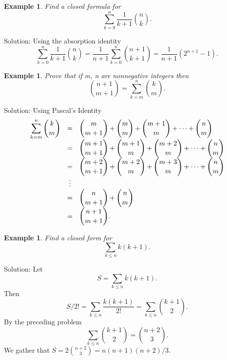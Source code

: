 \documentclass[11pt, openany]{book}
\theoremstyle{change} \theoremheaderfont{\blue\sffamily\bfseries}
\newtheorem{exa}[thm]{Example}
\theoremstyle{nonumberplain} \theoremheaderfont{\sffamily\bfseries}
\def\binom#1#2{{#1\choose#2}}
\newcommand{\í}{\'{\i}}
\begin{document}
\begin{exa} Find a closed formula for $$ \sum _{k = 0} ^n \frac{1}{k +
1}\binom{n}{k}.$$\end{exa} Solution:  Using the absorption
identity
$$ \sum _{k = 0} ^{n}\frac{1}{k + 1} \binom{n}{k} = \frac{1}{n + 1}\sum _{k = 0} ^n  \binom{n + 1}{k + 1} =
\frac{1}{n + 1}(2^{n + 1} - 1).$$

\begin{exa}Prove that if m, n are nonnegative integers then $$ \binom{n +
1}{m + 1} = \sum _{k = m} ^n \binom{k}{m}.$$ \end{exa} Solution:
Using Pascal's Identity
$$ {\everymath{\displaystyle}\begin{array}{lcl}
\sum _{k = m} ^n \binom{k}{m}  & = & \binom{m}{m + 1} + \binom{m}{m} + \binom{m + 1}{m} + \cdots + \binom{n}{m} \\
& = & \binom{m + 1}{m + 1} + \binom{m + 1}{m} + \binom{m + 2}{m} +
\cdots +
\binom{n}{m} \\
& = & \binom{m + 2}{m + 1} + \binom{m + 2}{m} + \binom{m + 3}{m} +
\cdots
+ \binom{n}{m} \\
& \vdots & \\
& = & \binom{n}{m + 1} + \binom{n}{m} \\
& = & \binom{n + 1}{m + 1}.\end{array}}$$
\begin{exa} Find a closed form for $$ \sum _{k \leq n} k(k + 1).$$ \end{exa}
Solution: Let $$ S = \sum _{k \leq n} k(k + 1).$$ Then
$$ S/2! = \sum _{k \leq n} \frac{k(k + 1)}{2!} = \sum _{k \leq n} \binom{k + 1}{2}.$$
By the preceding problem
$$ \sum _{k \leq n} \binom{k + 1}{2} = \binom{n + 2}{3}.$$We gather that $S = 2\binom{n + 2}{3}
= n(n + 1)(n + 2)/3$.
\end{document}
